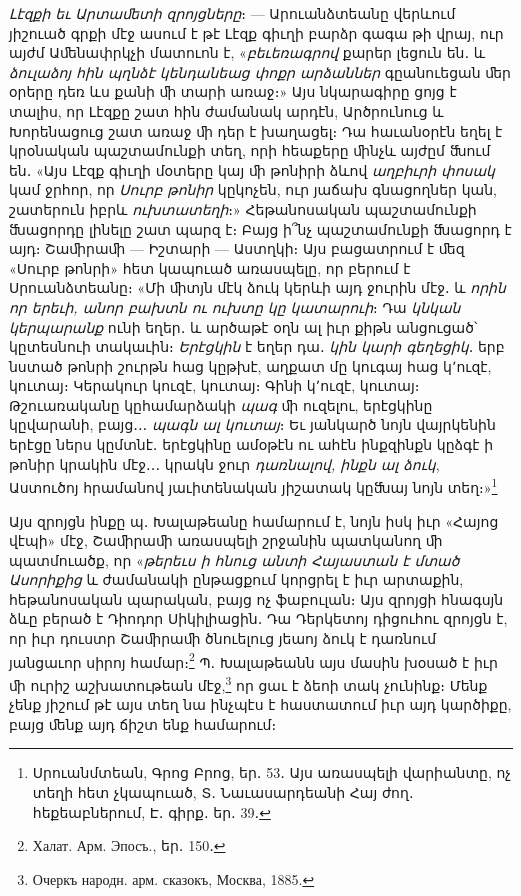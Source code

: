 \documentclass{article}
\begin{document}
{\emph{Լէզքի եւ Արտաﬔտի զրոյցները}։ — Արուանձտեանը վերևում յիշուած գրքի մէջ ասում է թէ Լէզք գիւղի բարձր գագա թի վրայ, ուր այժմ Աﬔնափրկչի մատուոն է, «\emph{բեւեռագրով} քարեր լեցուն են․ և \emph{ձուլաձոյ հին պղնձէ կենդանեաց փոքր արձաններ} գըանուեցան ﬔր օրերը դեռ ևս քանի ﬕ տարի առաջ։» Այս նկարագիրը ցոյց է տալիս, որ Լէզքը շատ հին ժամանակ արդէն, Արծրունուց և Խորենացուց շատ առաջ ﬕ դեր է խաղացել։ Դա հաւանօրէն եղել է կրօնական պաշտամունքի տեղ, որի հեաքերը ﬕնչև այժըմ ﬓում են․ «Այս Լէզք գիւղի մօտերը կայ ﬕ թոնիրի ձևով \emph{աղբիւրի փոսակ} կամ ջրհոր, որ \emph{Սուրբ թոնիր} կըկոչեն, ուր յաճախ գնացողներ կան, շատերուն իբրև \emph{ուխտատեղի}։» Հեթանոսական պաշտամունքի ﬓացորդը լինելը շատ պարզ է։ Բայց ի՞նչ պաշտամունքի ﬓացորդ է այդ։ Շաﬕրաﬕ — Իշտարի — Աստղկի։ Այս բացատրում է ﬔզ «Սուրբ թոնրի» հետ կապուած առասպելը, որ բերում է Սրուանձտեանը։ «Մի ﬕտյն մէկ ձուկ կերևի այդ ջուրին մէջ․ և \emph{որին որ երեւի, անոր բախտն ու ուխտը կը կատարուի}։ Դա \emph{կնկան կերպարանք} ունի եղեր․ և արծաթէ օղն ալ իւր քիթն անցուցած՝ կըտեսնուի տակաւին։ \emph{Երէցկին} է եղեր դա․ \emph{կին կարի գեղեցիկ}․ երբ նստած թոնրի շուրթն հաց կըթխէ, աղքատ մը կուգայ հաց կ՚ուզէ, կուտայ։ Կերակուր կուզէ, կուտայ։ Գինի կ՚ուզէ, կուտայ։ Թշուառականը կըհամարձակի \emph{պագ} ﬕ ուզելու, երէցկինը կըվարանի, բայց․․․ \emph{պագն ալ կուտայ}։ Եւ յանկարծ նոյն վայրկենին երէցը ներս կըմտնէ․ երէցկինը ամօթէն ու ահէն ինքզինքն կըձգէ ի թոնիր կրակին մէջ․․․ կրակն ջուր \emph{դառնալով, ինքն ալ ձուկ}, Աստուծոյ հրամանով յաւիտենական յիշատակ կըﬓայ նոյն տեղ։»\footnote{Սրուանմտեան, Գրոց Բրոց, եր․ 53․ Այս առասպելի վարիանտը, ոչ տեղի հետ չկապուած, Տ․ Նաւասարդեանի Հայ ժող․ հեքեաբներում, Է․ գիրք․ եր․ 39․}

Այս զրոյցն ինքը պ․ Խալաթեանը համարում է, նոյն իսկ իւր «Հայոց վէպի» մէջ, Շաﬕրաﬕ առասպելի շրջանին պատկանող ﬕ պատմուածք, որ «\emph{թերեւս ի հնուց անտի Հայաստան է մտած Ասորիքից} և ժամանակի ընթացքում կորցրել է իւր արտաքին, հեթանոսական պարական, բայց ոչ ֆաբուլան։ Այս զրոյցի հնագսյն ձևը բերած է Դիոդոր Սիկիլիացին․ Դա Դերկետոյ դիցուհու զրոյցն է, որ իւր դուստր Շաﬕրաﬕ ծնուելուց յեաոյ ձուկ է դառնում յանցաւոր սիրոյ համար։\footnote{Халат. Арм. Эпосъ., եր․ 150․} Պ․ Խալաթեանն այս մասին խօսած է իւր ﬕ ուրիշ աշխատութեան մէջ,\footnote{Очеркъ народн. арм. сказокъ, Москва, 1885.} որ ցաւ է ձեոի տակ չունինք։ Մենք չենք յիշում թէ այս տեղ նա ինչպէս է հաստատում իւր այդ կարծիքը, բայց ﬔնք այդ ճիշտ ենք համարում։

}
\end{document}

